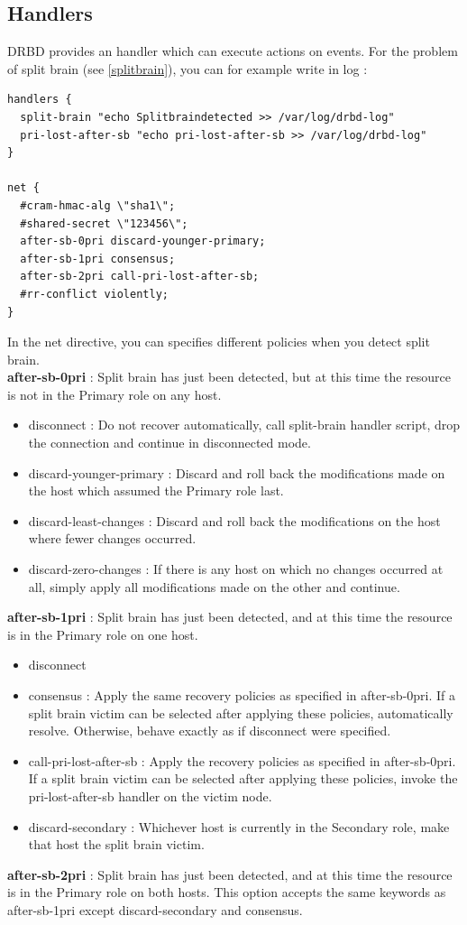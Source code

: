 \documentclass[a4paper,10pt]{report}
\begin{document}
\subsection{Handlers}
DRBD provides an handler which can execute actions on events. For the problem of split brain (see \ref{splitbrain}), you can for example write in log :
\begin{lstlisting}
handlers {
  split-brain "echo Splitbraindetected >> /var/log/drbd-log"
  pri-lost-after-sb "echo pri-lost-after-sb >> /var/log/drbd-log"
}

net {
  #cram-hmac-alg \"sha1\";
  #shared-secret \"123456\";
  after-sb-0pri discard-younger-primary;
  after-sb-1pri consensus;
  after-sb-2pri call-pri-lost-after-sb;
  #rr-conflict violently;
}
\end{lstlisting}
In the net directive, you can specifies different policies when you detect split brain.\\
\textbf{after-sb-0pri} : Split brain has just been detected, but at this time the resource is not in the Primary role on any host.
\begin{itemize}
\item disconnect : Do not recover automatically, call split-brain handler script, drop the connection and continue in disconnected mode.
\item discard-younger-primary : Discard and roll back the modifications made on the host which assumed the Primary role last.
\item discard-least-changes : Discard and roll back the modifications on the host where fewer changes occurred.
\item discard-zero-changes : If there is any host on which no changes occurred at all, simply apply all modifications made on the other and continue.
\end{itemize}
\textbf{after-sb-1pri} : Split brain has just been detected, and at this time the resource is in the Primary role on one host.
\begin{itemize}
\item disconnect 
\item consensus : Apply the same recovery policies as specified in after-sb-0pri. If a split brain victim can be selected after applying these policies, automatically resolve. Otherwise, behave exactly as if disconnect were specified.
\item call-pri-lost-after-sb : Apply the recovery policies as specified in after-sb-0pri. If a split brain victim can be selected after applying these policies, invoke the pri-lost-after-sb handler on the victim node.
\item discard-secondary : Whichever host is currently in the Secondary role, make that host the split brain victim.
\end{itemize}
\textbf{after-sb-2pri} : Split brain has just been detected, and at this time the resource is in the Primary role on both hosts. This option accepts the same keywords as after-sb-1pri except discard-secondary and consensus.
\end{document}
